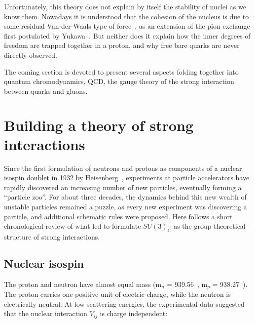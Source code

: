Unfortunately, this theory does not explain by itself the stability of nuclei as we know them. Nowadays it is understood that the
cohesion of the nucleus is due to some residual Van-der-Waals
type of force~\cite{longrangeqcd}, as an extension of the pion
exchange first postulated by Yukawa~\cite{yukawa}. But neither does it explain how the inner degrees of freedom are trapped together in a proton, and
why free bare quarks are never directly observed.

The coming section is devoted to present several aspects folding
together into quantum chromodynamics, QCD, the gauge theory of the strong
interaction between quarks and gluons.

\section{Building a theory of strong interactions}
\label{sec:strong}
Since the first formulation of neutrons and protons as components of a nuclear
isospin doublet in 1932 by Heisenberg~\cite{heisenberg}, experiments at particle
accelerators have rapidly discovered an increasing number of new particles,
eventually forming a ``particle zoo''. For
about three decades, the dynamics behind this new wealth of unstable particles remained a
puzzle, as every new experiment was discovering a particle, and
additional schematic rules were proposed. Here follows a short chronological review
of what led to formulate $SU(3)_C$ as the group theoretical structure of strong interactions.

\subsection{Nuclear isospin}
\label{sec:isospin}
The proton and neutron have almost equal mass (m$_{n}$ = 939.56~\MeVmass, m$_{p}$ = 938.27~\MeVmass). The proton carries
one positive unit of electric charge, while the neutron is
electrically neutral. At low scattering energies, the experimental
data suggested that the nuclear interaction
$V_{ij}$ is charge independent:

